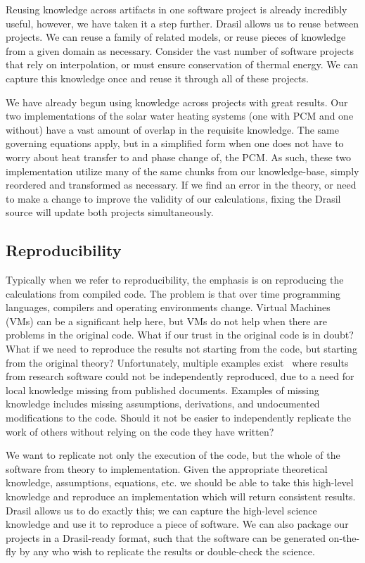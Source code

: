 \documentclass[sigconf]{acmart}
\begin{document}
{Reusing knowledge across artifacts in one software project is already 
incredibly useful, however, we have taken it a step further. Drasil allows us 
to reuse between projects. We can reuse a family of related models, or reuse 
pieces of knowledge from a given domain as necessary. Consider the vast number 
of software projects that rely on interpolation, or must ensure conservation of thermal 
energy. We can capture this knowledge once and reuse it through all of these 
projects.

We have already begun using knowledge across projects with great results. Our
two implementations of the solar water heating systems (one with PCM and one
without) have a vast amount of overlap in the requisite knowledge.  The same
governing equations apply, but in a simplified form when one does not have to
worry about heat transfer to and phase change of, the PCM. As such, these two
implementation utilize many of the same chunks from our knowledge-base, simply
reordered and transformed as necessary. If we find an error in the theory, or
need to make a change to improve the validity of our calculations, fixing the
Drasil source will update both projects simultaneously.

\subsection{Reproducibility}

Typically when we refer to reproducibility, the emphasis is on reproducing the
calculations from compiled code. The problem is that over time programming
languages, compilers and operating environments change.  Virtual Machines (VMs)
can be a significant help here, but VMs do not help when there are problems in
the original code.  What if our trust in the original code is in doubt?  What if
we need to reproduce the results not starting from the code, but starting from
the original theory?  Unfortunately, multiple examples
exist~\cite{CrickAndHall2014, IonescuAndJansson2013} where results from research
software could not be independently reproduced, due to a need for local
knowledge missing from published documents.  Examples of missing knowledge
includes missing assumptions, derivations, and undocumented modifications
to the code.  Should it not be easier to independently replicate the work of
others without relying on the code they have written?

We want to replicate not only the execution of the code, but the whole of the 
software from theory to implementation. Given the appropriate theoretical 
knowledge, assumptions, equations, etc. we should be able to take this 
high-level knowledge and reproduce an implementation which will return 
consistent results. Drasil allows us to do exactly this; we can capture the 
high-level science knowledge and use it to reproduce a piece of software. We 
can also package our projects in a Drasil-ready format, such that the software 
can be generated on-the-fly by any who wish to replicate the results or 
double-check the science.

}
\end{document}
